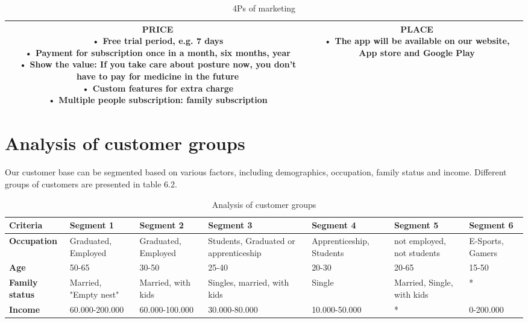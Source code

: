 \begin{table}[H]
\begin{tabular}{|c|c|}
{        \textbf{PRICE}\\
        •	Free trial period, e.g. 7 days\\
        •	Payment for subscription once in a month, six months, year\\
        •	Show the value: If you take care about posture now, you don't have to pay for medicine in the future\\
        •	Custom features for extra charge\\
        •	Multiple people subscription: family subscription\\  
        \vspace{5pt}} & \parbox{7cm}{\vspace{5pt}
        \textbf{PLACE}\\
        •	The app will be available on our website, App store and Google Play     
        \vspace{5pt}} \\
    \hline
    \end{tabular}
    \caption{4Ps of marketing}
\end{table}

\section{Analysis of customer groups}

Our customer base can be segmented based on various factors, including demographics, occupation, family status and income. Different groups of customers are presented in table 6.2.

\begin{table}[H]
    \centering
    \small 
    \begin{tabular}{|p{1.9cm}|p{2cm}|p{2cm}|p{2cm}|p{2.1cm}|p{2cm}|p{2cm}|}
        \hline
        \textbf{Criteria} & \textbf{Segment 1} & \textbf{Segment 2} & \textbf{Segment 3} & \textbf{Segment 4} & \textbf{Segment 5} & \textbf{Segment 6} \\
        \hline
        \textbf{Occupation} & Graduated, Employed & Graduated, Employed	& Students, Graduated or apprenticeship	& Apprenticeship, Students	& not employed, not students & E-Sports, Gamers \\
        \hline
        \textbf{Age} & 50-65 & 30-50 & 25-40 & 20-30 & 20-65 & 15-50 \\
        \hline
        \textbf{Family status} & Married, "Empty nest" & Married, with kids & Singles, married, with kids & Single & Married, Single, with kids & *\\
        \hline
        \textbf{Income} & 60.000-200.000 & 60.000-100.000 & 30.000-80.000 & 10.000-50.000 & * & 0-200.000\\
        \hline
    \end{tabular}
    \caption{Analysis of customer groups}
    \label{tab:example}
\end{table}

